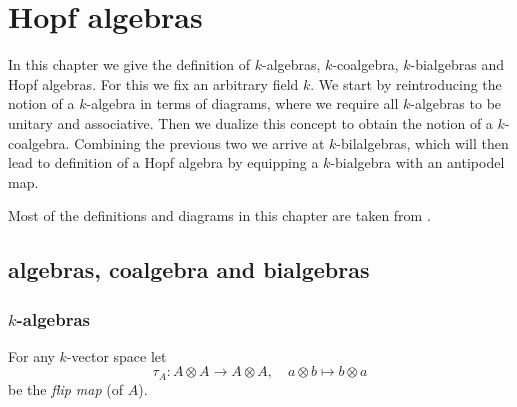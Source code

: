 \chapter{Hopf algebras}
In this chapter we give the definition of $k$-algebras, $k$-coalgebra, $k$-bialgebras and Hopf algebras. For this we fix an arbitrary field $k$. We start by reintroducing the notion of a $k$-algebra in terms of diagrams, where we require all $k$-algebras to be unitary and associative. Then we dualize this concept to obtain the notion of a $k$-coalgebra. Combining the previous two we arrive at $k$-bilalgebras, which will then lead to definition of a Hopf algebra by equipping a $k$-bialgebra with an antipodel map.

Most of the definitions and diagrams in this chapter are taken from \cite{Brown}.





\section{algebras, coalgebra and bialgebras}



\subsection{\texorpdfstring{$k$}{k}-algebras}


\begin{defi}
 For any $k$-vector space let
 \[
  \tau_A \colon A \otimes A \to A \otimes A, \quad a \otimes b \mapsto b \otimes a
 \]
 be the \emph{flip map} (of $A$).
\end{defi}



